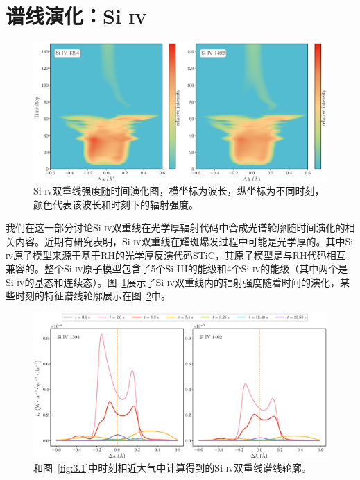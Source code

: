 \section{谱线演化：Si \textsc{iv}}
\begin{figure}
	\centering
	\includegraphics[width=\textwidth]{figs/5F11_spectra_imshow_Si}
	\caption{Si \textsc{iv}双重线强度随时间演化图，横坐标为波长，纵坐标为不同时刻，颜色代表该波长和时刻下的辐射强度。}
	\label{fig:3.8}
\end{figure}
我们在这一部分讨论Si \textsc{iv}双重线在光学厚辐射代码中合成光谱轮廓随时间演化的相关内容。近期有研究表明，Si \textsc{iv}双重线在耀斑爆发过程中可能是光学厚的\parencites{Kerr2019}。其中Si \textsc{iv}原子模型来源于基于RH的光学厚反演代码STiC\parencites{Rodriguez2016,Rodriguez2019}，其原子模型是与RH代码相互兼容的。整个Si \textsc{iv}原子模型包含了5个Si III的能级和4个Si \textsc{iv}的能级（其中两个是Si \textsc{iv}的基态和连续态）。图~\ref{fig:3.8}展示了Si \textsc{iv}双重线内的辐射强度随着时间的演化，某些时刻的特征谱线轮廓展示在图~\ref{fig:3.9}中。
\begin{figure}
	\centering
	\includegraphics[width=\textwidth]{figs/5F11_spectra_line_Si}
	\caption{和图~\ref{fig:3.1}中时刻相近大气中计算得到的Si \textsc{iv}双重线谱线轮廓。}
	\label{fig:3.9}
\end{figure}

